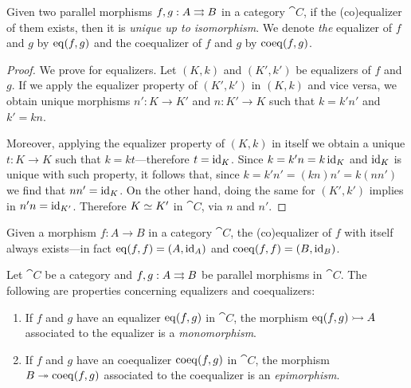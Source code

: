 \begin{proposition}[Uniqueness]
    \label{prop:(co)equalizer-unique-up-to-iso}
    Given two parallel morphisms \(f, g: A \rightrightarrows B\) in a category \(\cat C\), if
    the (co)equalizer of them exists, then it is \emph{unique up to isomorphism}. We
    denote \emph{the} equalizer of \(f\) and \(g\) by \(\operatorname{eq}(f, g)\) and the
    coequalizer of \(f\) and \(g\) by \(\operatorname{coeq}(f, g)\).
\end{proposition}

\begin{proof}
    We prove for equalizers. Let \((K, k)\) and \((K', k')\) be equalizers of \(f\)
    and \(g\). If we apply the equalizer property of \((K', k')\) in \((K, k)\) and
    vice versa, we obtain unique morphisms \(n': K \to K'\) and \(n: K' \to K\) such
    that \(k = k' n'\) and \(k' = k n\).

    Moreover, applying the equalizer property of \((K, k)\) in itself we obtain a
    unique \(t: K \to K\) such that \(k = k t\)---therefore \(t = \operatorname{id}_K\). Since
    \(k = k' n = k \operatorname{id}_K\) and \(\operatorname{id}_K\) is unique with such property, it follows
    that, since \(k = k' n' = (k n) n' = k (n n')\) we find that \(n n' =
    \operatorname{id}_K\). On the other hand, doing the same for \((K', k')\) implies in \(n' n =
    \operatorname{id}_{K'}\). Therefore \(K \simeq K'\) in \(\cat C\), via \(n\) and \(n'\).
\end{proof}

\begin{corollary}
    \label{cor:self-(co)equalizer}
    Given a morphism \(f: A \to B\) in a category \(\cat C\), the (co)equalizer of
    \(f\) with itself always exists---in fact \(\operatorname{eq}(f, f) = (A, \operatorname{id}_A)\) and
    \(\operatorname{coeq}(f, f) = (B, \operatorname{id}_{B})\).
\end{corollary}

\begin{proposition}
    \label{prop:eq-monic-coeq-epic}
    Let \(\cat C\) be a category and \(f, g: A \rightrightarrows B\) be parallel morphisms in
    \(\cat C\). The following are properties concerning equalizers and coequalizers:
    \begin{enumerate}\setlength\itemsep{0em}
        \item If \(f\) and \(g\) have an equalizer \(\operatorname{eq}(f, g)\) in \(\cat C\), the
              morphism \(\operatorname{eq}(f, g) \rightarrowtail A\) associated to the equalizer is a
              \emph{monomorphism}.

        \item If \(f\) and \(g\) have an coequalizer \(\operatorname{coeq}(f, g)\) in \(\cat C\), the
              morphism \(B \twoheadrightarrow \operatorname{coeq}(f, g)\) associated to the coequalizer is an
              \emph{epimorphism}.
    \end{enumerate}
\end{proposition}

